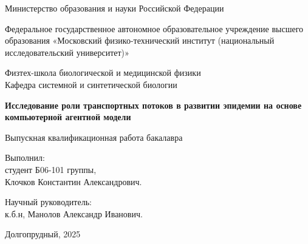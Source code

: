 \documentclass[a4paper,12pt]{article} %
\begin{document}
\begin{titlepage}

\begin{center}
    {\large Министерство образования и науки Российской Федерации}
\end{center}
\begin{center}
    {\large Федеральное государственное автономное 
образовательное учреждение высшего образования 
«Московский физико-технический институт 
(национальный исследовательский университет)»}
\end{center}
\begin{center}
    {\large Физтех-школа биологической и медицинской физики \\ Кафедра системной и синтетической биологии}
\end{center}

    \vspace{3.5cm}


\vspace{0.1cm}
{\huge
\begin{center}
    \textbf{Исследование роли транспортных потоков в развитии эпидемии на основе компьютерной агентной модели}
   \\
\end{center}
}
{\large
\begin{center}
    Выпускная квалификационная работа бакалавра
   \\
\end{center}
}

\vspace{3.5cm}

\begin{flushright}
\large Выполнил:\\ студент Б06-101 группы, \\Клочков Константин Александрович.
\vspace{0.2cm}
\end{flushright}

\begin{flushright}
\large Научный руководитель: \\ к.б.н, Манолов Александр Иванович.
\vspace{0.2cm}
\end{flushright}

\vspace{2.5cm}

\begin{center}
    Долгопрудный, 2025
\end{center}

\end{titlepage}
\end{document}
